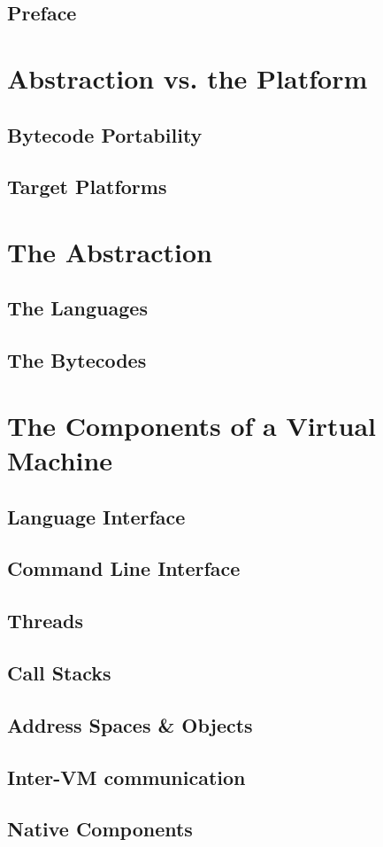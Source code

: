 
\section*{Preface}



\chapter{Abstraction vs. the Platform}

\section{Bytecode Portability}

\section{Target Platforms}

\chapter{The Abstraction}

\section{The Languages}

\section{The Bytecodes}

\chapter{The Components of a Virtual Machine}

\section{Language Interface}

\section{Command Line Interface}

\section{Threads}

\section{Call Stacks}

\section{Address Spaces \& Objects}

\section{Inter-VM communication} %

\section{Native Components} %


